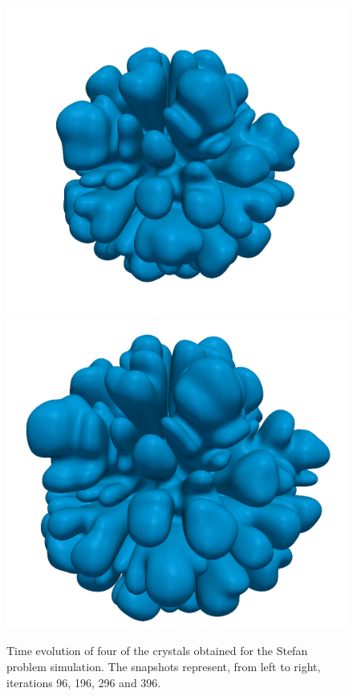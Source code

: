 \begin{figure}[ht!]
\begin{center}
{\includegraphics[width=.24\textwidth]{figures/stefan_nb12_iter59.png}
\includegraphics[width=.24\textwidth]{figures/stefan_nb12_iter79.png}
}
\caption{Time evolution of four of the crystals obtained for the Stefan problem simulation. The snapshots represent, from left to right, iterations 96, 196, 296 and 396.} \label{fig:stefan_evolution}
\end{center}
\end{figure}
